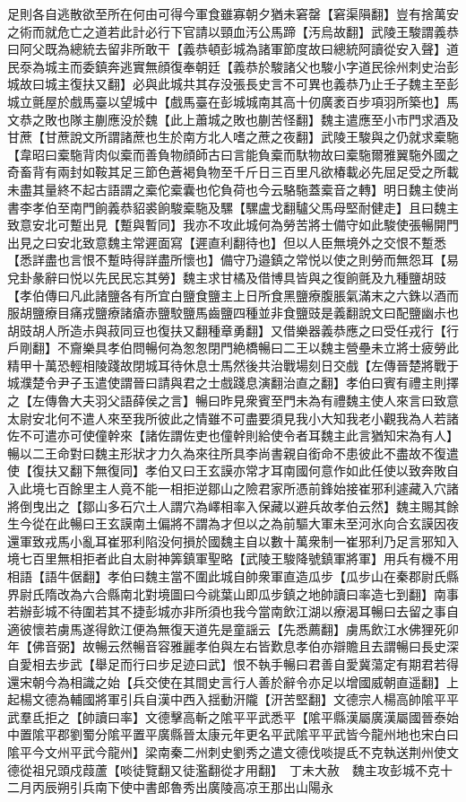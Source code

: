 足則各自逃散欲至所在何由可得今軍食雖寡朝夕猶未窘罄【窘渠隕翻】豈有捨萬安之術而就危亡之道若此計必行下官請以頸血汚公馬蹄【汚烏故翻】武陵王駿謂義恭曰阿父既為總統去留非所敢干【義恭頓彭城為諸軍節度故曰總統阿讀從安入聲】道民沗為城主而委鎮奔逃實無顔復奉朝廷【義恭於駿諸父也駿小字道民徐州刺史治彭城故曰城主復扶又翻】必與此城共其存没張長史言不可異也義恭乃止壬子魏主至彭城立氈屋於戲馬臺以望城中【戲馬臺在彭城城南其高十仞廣袤百步項羽所築也】馬文恭之敗也隊主蒯應没於魏【此上蕭城之敗也蒯苦怪翻】魏主遣應至小市門求酒及甘蔗【甘蔗說文所謂諸蔗也生於南方北人嗜之蔗之夜翻】武陵王駿與之仍就求槖駞【韋昭曰槖駞背肉似槖而善負物顔師古曰言能負槖而馱物故曰槖駞爾雅翼駞外國之奇畜背有兩封如鞍其足三節色蒼褐負物至千斤日三百里凡欲椿載必先屈足受之所載未盡其量終不起古語謂之槖佗槖囊也佗負荷也今云駱駞蓋槖音之轉】明日魏主使尚書李孝伯至南門餉義恭貂裘餉駿槖駞及騾【騾盧戈翻驢父馬母堅耐健走】且曰魏主致意安北可蹔出見【蹔與暫同】我亦不攻此城何為勞苦將士備守如此駿使張暢開門出見之曰安北致意魏主常遲面寫【遲直利翻待也】但以人臣無境外之交恨不蹔悉【悉詳盡也言恨不蹔時得詳盡所懷也】備守乃邉鎮之常悦以使之則勞而無怨耳【易兌卦彖辭曰悦以先民民忘其勞】魏主求甘橘及借博具皆與之復餉氈及九種鹽胡豉【孝伯傳曰凡此諸鹽各有所宜白鹽食鹽主上日所食黑鹽療腹脹氣滿末之六銖以酒而服胡鹽療目痛戎鹽療諸瘡赤鹽駮鹽馬齒鹽四種並非食鹽豉是義翻說文曰配鹽幽尗也胡豉胡人所造尗與菽同豆也復扶又翻種章勇翻】又借樂器義恭應之曰受任戎行【行戶剛翻】不齎樂具孝伯問暢何為怱怱閉門絶橋暢曰二王以魏主營壘未立將士疲勞此精甲十萬恐輕相陵踐故閉城耳待休息士馬然後共治戰場刻日交戲【左傳晉楚將戰于城濮楚令尹子玉遣使謂晉曰請與君之士戲踐息演翻治直之翻】孝伯曰賓有禮主則擇之【左傳魯大夫羽父語薛侯之言】暢曰昨見衆賓至門未為有禮魏主使人來言曰致意太尉安北何不遣人來至我所彼此之情雖不可盡要須見我小大知我老小觀我為人若諸佐不可遣亦可使僮幹來【諸佐謂佐吏也僮幹則給使令者耳魏主此言猶知宋為有人】暢以二王命對曰魏主形狀才力久為來往所具李尚書親自銜命不患彼此不盡故不復遣使【復扶又翻下無復同】孝伯又曰王玄謨亦常才耳南國何意作如此任使以致奔敗自入此境七百餘里主人竟不能一相拒逆鄒山之險君家所憑前鋒始接崔邪利遽藏入穴諸將倒曳出之【鄒山多石穴土人謂穴為嶧相率入保藏以避兵故孝伯云然】魏主賜其餘生今從在此暢曰王玄謨南土偏將不謂為才但以之為前驅大軍未至河氷向合玄謨因夜還軍致戎馬小亂耳崔邪利陷没何損於國魏主自以數十萬衆制一崔邪利乃足言邪知入境七百里無相拒者此自太尉神筭鎮軍聖略【武陵王駿降號鎮軍將軍】用兵有機不用相語【語牛倨翻】孝伯曰魏主當不圍此城自帥衆軍直造瓜步【瓜步山在秦郡尉氏縣界尉氏隋改為六合縣南北對境圖曰今祧葉山即瓜步鎮之地帥讀曰率造七到翻】南事若辦彭城不待圍若其不捷彭城亦非所須也我今當南飲江湖以療渴耳暢曰去留之事自適彼懷若虜馬遂得飲江便為無復天道先是童謡云【先悉薦翻】虜馬飲江水佛狸死卯年【佛音弼】故暢云然暢音容雅麗孝伯與左右皆歎息孝伯亦辯贍且去謂暢曰長史深自愛相去步武【舉足而行曰步足迹曰武】恨不執手暢曰君善自愛冀蕩定有期君若得還宋朝今為相識之始【兵交使在其間史言行人善於辭令亦足以增國威朝直遥翻】上起楊文德為輔國將軍引兵自漢中西入揺動汧隴【汧苦堅翻】文德宗人楊高帥隂平平武羣氐拒之【帥讀曰率】文德擊高斬之隂平平武悉平【隂平縣漢屬廣漢屬國晉泰始中置隂平郡劉蜀分隂平置平廣縣晉太康元年更名平武隂平平武皆今龍州地也宋白曰隂平今文州平武今龍州】梁南秦二州刺史劉秀之遣文德伐啖提氐不克執送荆州使文德從祖兄頭戍葭蘆【啖徒覽翻又徒濫翻從才用翻】　丁未大赦　魏主攻彭城不克十二月丙辰朔引兵南下使中書郎魯秀出廣陵高凉王那出山陽永
